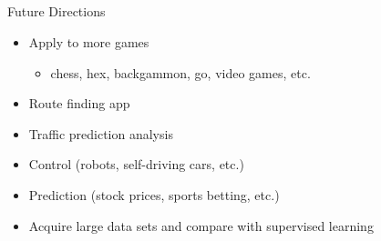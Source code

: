 \subsection{}
\begin{frame}[c]{Future Directions}\centering
\begin{itemize}
\item Apply to more games
\begin{itemize}
\item chess, hex, backgammon, go, video games, etc.
\end{itemize}
\item Route finding app
\item Traffic prediction analysis
\item Control (robots, self-driving cars, etc.)
\item Prediction (stock prices, sports betting, etc.)
\item Acquire large data sets and compare with supervised learning
\end{itemize}
\end{frame}

